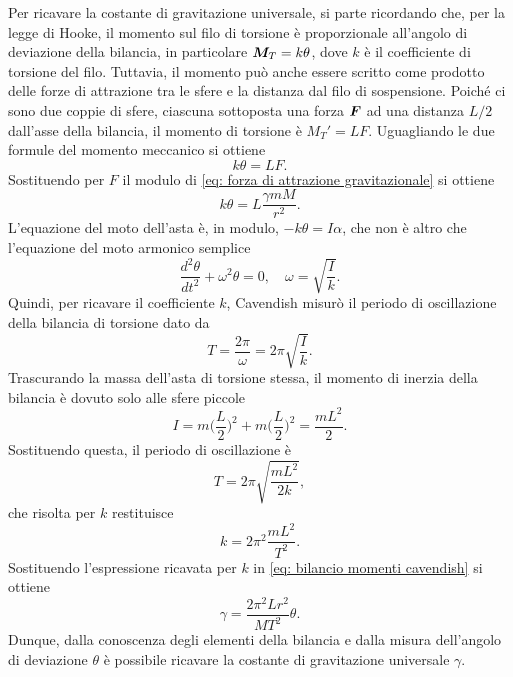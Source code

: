 Per ricavare la costante di gravitazione universale, si parte ricordando che, per la legge di Hooke, il momento sul filo di torsione è proporzionale all'angolo di deviazione della bilancia, in particolare $\bm{M}_T=k\theta$, dove $k$ è il coefficiente di torsione del filo. Tuttavia, il momento può anche essere scritto come prodotto delle forze di attrazione tra le sfere e la distanza dal filo di sospensione. Poiché ci sono due coppie di sfere, ciascuna sottoposta una forza $\bm{F}$ ad una distanza $L/2$ dall'asse della bilancia, il momento di torsione è $M_T'=LF$. Uguagliando le due formule del momento meccanico si ottiene 
\begin{equation}
    k\theta=LF.
\end{equation}
Sostituendo per $F$ il modulo di \eqref{eq: forza di attrazione gravitazionale} si ottiene
\begin{equation}
\label{eq: bilancio momenti cavendish}
    k\theta=L\frac{\gamma mM}{r^2}.
\end{equation}
L'equazione del moto dell'asta è, in modulo, $-k\theta=I\alpha$, che non è altro che l'equazione del moto armonico semplice
\begin{equation}
    \frac{d^2\theta}{dt^2}+\omega^2\theta=0,\quad\omega=\sqrt{\frac{I}{k}}.
\end{equation}
Quindi, per ricavare il coefficiente $k$, Cavendish misurò il periodo di oscillazione della bilancia di torsione dato da
\begin{equation}
    T=\frac{2\pi}{\omega}=2\pi\sqrt{\frac{I}{k}}.
\end{equation}
Trascurando la massa dell'asta di torsione stessa, il momento di inerzia della bilancia è dovuto solo alle sfere piccole
\begin{equation}
    I=m\bigg(\frac{L}{2}\bigg)^2+m\bigg(\frac{L}{2}\bigg)^2=\frac{mL^2}{2}.
\end{equation}
Sostituendo questa, il periodo di oscillazione è
\begin{equation}
    T=2\pi\sqrt{\frac{mL^2}{2k}},
\end{equation}
che risolta per $k$ restituisce
\begin{equation}
    k=2\pi^2\frac{mL^2}{T^2}.
\end{equation}
Sostituendo l'espressione ricavata per $k$ in \eqref{eq: bilancio momenti cavendish} si ottiene
\begin{equation}
    \gamma=\frac{2\pi^2Lr^2}{MT^2}\theta.
\end{equation}
Dunque, dalla conoscenza degli elementi della bilancia e dalla misura dell'angolo di deviazione $\theta$ è possibile ricavare la costante di gravitazione universale $\gamma$. 

